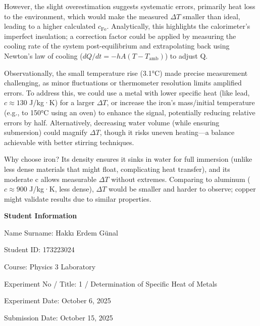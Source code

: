 \documentclass[12pt, a4paper]{article}
\begin{document}
However, the slight overestimation suggests systematic errors, primarily heat loss to the environment, which would make the measured $\Delta T$ smaller than ideal, leading to a higher calculated $c_{\text{Fe}}$. Analytically, this highlights the calorimeter's imperfect insulation; a correction factor could be applied by measuring the cooling rate of the system post-equilibrium and extrapolating back using Newton's law of cooling ($dQ/dt = -hA (T - T_{\text{amb}})$) to adjust Q.

Observationally, the small temperature rise (3.1°C) made precise measurement challenging, as minor fluctuations or thermometer resolution limits amplified errors. To address this, we could use a metal with lower specific heat (like lead, $c \approx 130$ J/kg·K) for a larger $\Delta T$, or increase the iron's mass/initial temperature (e.g., to 150°C using an oven) to enhance the signal, potentially reducing relative errors by half. Alternatively, decreasing water volume (while ensuring submersion) could magnify $\Delta T$, though it risks uneven heating---a balance achievable with better stirring techniques.

Why choose iron? Its density ensures it sinks in water for full immersion (unlike less dense materials that might float, complicating heat transfer), and its moderate c allows measurable $\Delta T$ without extremes. Comparing to aluminum ($c \approx 900$ J/kg·K, less dense), $\Delta T$ would be smaller and harder to observe; copper might validate results due to similar properties.

\newpage

\textbf{Student Information}

Name Surname: Hakkı Erdem Günal

Student ID: 173223024

Course: Physics 3 Laboratory

Experiment No / Title: 1 / Determination of Specific Heat of Metals

Experiment Date: October 6, 2025

Submission Date: October 15, 2025
\end{document}
